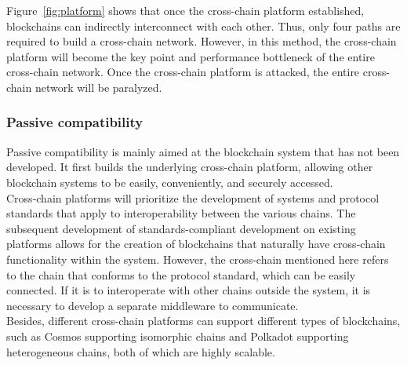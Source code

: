 \begin{enumerate}
\begin{figure}[H]
        \end{figure}
  Figure~\ref{fig:platform} shows that once the cross-chain platform established, blockchains can indirectly interconnect with each other. Thus, only four paths are required to build a cross-chain network. However, in this method, the cross-chain platform will become the key point and performance bottleneck of the entire cross-chain network. Once the cross-chain platform is attacked, the entire cross-chain network will be paralyzed.
\end{enumerate}
\subsubsection{Passive compatibility}
\noindent Passive compatibility is mainly aimed at the blockchain system that has not been developed. It first builds the underlying cross-chain platform, allowing other blockchain systems to be easily, conveniently, and securely accessed.\\

\noindent Cross-chain platforms will prioritize the development of systems and protocol standards that apply to interoperability between the various chains. The subsequent development of standards-compliant development on existing platforms allows for the creation of blockchains that naturally have cross-chain functionality within the system. However, the cross-chain mentioned here refers to the chain that conforms to the protocol standard, which can be easily connected. If it is to interoperate with other chains outside the system, it is necessary to develop a separate middleware to communicate.\\

\noindent Besides, different cross-chain platforms can support different types of blockchains, such as Cosmos supporting isomorphic chains and Polkadot supporting heterogeneous chains, both of which are highly scalable.
